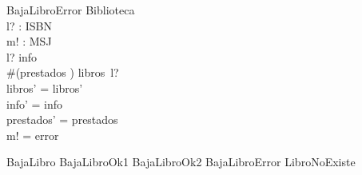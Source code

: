 \documentclass{article}
\begin{document}
\begin{schema}{BajaLibroError}
\Delta Biblioteca \\
l? : ISBN \\
m! : MSJ \\
\where
l? \in \dom info \\
\#(prestados \rres {}) \geq libros~l? \\
libros' = libros' \\
info' = info \\
prestados' = prestados \\
m! = error \\
\end{schema}

\begin{zed}
    BajaLibro  BajaLibroOk1 \lor BajaLibroOk2 \lor BajaLibroError \lor LibroNoExiste
\end{zed}
\end{document}
